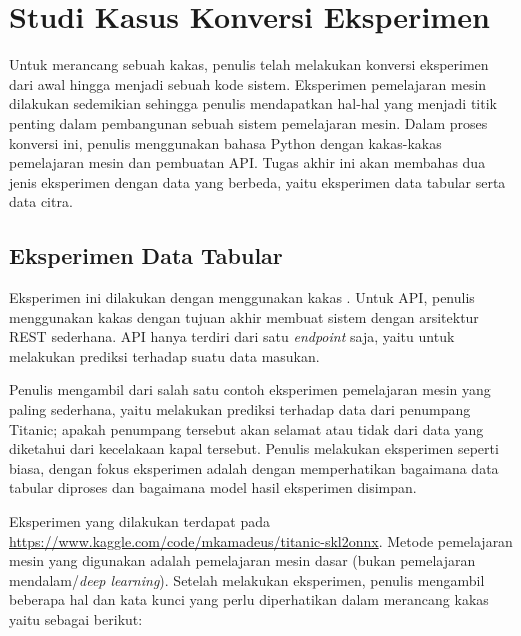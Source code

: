 \section{Studi Kasus Konversi Eksperimen}

Untuk merancang sebuah kakas, penulis telah melakukan konversi eksperimen dari awal hingga menjadi sebuah kode sistem.
Eksperimen pemelajaran mesin dilakukan sedemikian sehingga penulis mendapatkan hal-hal yang menjadi titik penting dalam pembangunan sebuah sistem pemelajaran mesin.
Dalam proses konversi ini, penulis menggunakan bahasa Python dengan kakas-kakas pemelajaran mesin dan pembuatan API\@.
Tugas akhir ini akan membahas dua jenis eksperimen dengan data yang berbeda, yaitu eksperimen data tabular serta data citra.

\subsection{Eksperimen Data Tabular}\label{section:03-tabular-experiment}

Eksperimen ini dilakukan dengan menggunakan kakas .
Untuk API, penulis menggunakan kakas  dengan tujuan akhir membuat sistem dengan arsitektur REST sederhana.
API hanya terdiri dari satu \textit{endpoint} saja, yaitu untuk melakukan prediksi terhadap suatu data masukan.

Penulis mengambil dari salah satu contoh eksperimen pemelajaran mesin yang paling sederhana, yaitu melakukan prediksi terhadap data dari penumpang Titanic; apakah penumpang tersebut akan selamat atau tidak dari data yang diketahui dari kecelakaan kapal tersebut.
Penulis melakukan eksperimen seperti biasa, dengan fokus eksperimen adalah dengan memperhatikan bagaimana data tabular diproses dan bagaimana model hasil eksperimen disimpan.

Eksperimen yang dilakukan terdapat pada \url{https://www.kaggle.com/code/mkamadeus/titanic-skl2onnx}.
Metode pemelajaran mesin yang digunakan adalah pemelajaran mesin dasar (bukan pemelajaran mendalam/\textit{deep learning}).
Setelah melakukan eksperimen, penulis mengambil beberapa hal dan kata kunci yang perlu diperhatikan dalam merancang kakas yaitu sebagai berikut:

